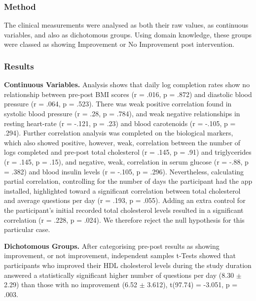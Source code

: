 \subsubsection{Method}
The clinical measurements were analysed as both their raw values, as continuous variables, and also as dichotomous groups. Using domain knowledge, these groups were classed as showing Improvement or No Improvement post intervention.
\subsubsection{Results}

\textbf{Continuous Variables.}
Analysis shows that daily log completion rates show no relationship between pre-post BMI scores (r = .016, p = .872) and diastolic blood pressure (r = .064, p = .523). There was weak positive correlation found in systolic blood pressure (r = .28, p = .784), and weak negative relationships in resting heart-rate (r = -.121, p = .23) and blood carotenoids (r = -.105, p = .294). Further correlation analysis was completed on the biological markers, which also showed positive, however, weak, correlation between the number of logs completed and pre-post total cholesterol (r = .145, p = .91) and triglycerides (r = .145, p = .15), and negative, weak, correlation in serum glucose (r = -.88, p = .382) and blood insulin levels (r = -.105, p = .296).
Nevertheless, calculating partial correlation, controlling for the number of days the participant had the app installed, highlighted toward a significant correlation between total cholesterol and average questions per day (r = .193, p = .055). Adding an extra control for the participant’s initial recorded total cholesterol levels resulted in a significant correlation (r = .228, p = .024). We therefore reject the null hypothesis for this particular case.

\textbf{Dichotomous Groups.}
After categorising pre-post results as showing improvement, or not improvement, independent samples t-Tests showed that participants who improved their HDL cholesterol levels during the study duration answered a statistically significant higher number of questions per day (8.30 $\pm$ 2.29) than those with no improvement (6.52 $\pm$ 3.612), t(97.74) = -3.051, p = .003.

